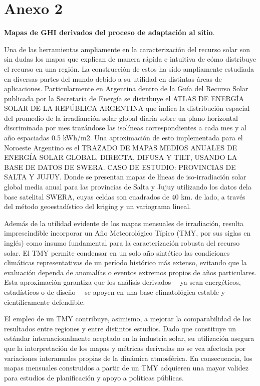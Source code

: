 \rhead{\newtitle}
\cfoot{\thepage}
\renewcommand{\headrulewidth}{1pt}
\renewcommand{\footrulewidth}{1pt}

\chapter*{Anexo 2}


\noindent \textbf{Mapas de GHI derivados del proceso de adaptación al sitio}.

Una de las herramientas ampliamente en la caracterización del recurso solar son sin dudas los mapas que explican de manera rápida e intuitiva de cómo distribuye el recurso en una región. La construcción de estos ha sido ampliamente estudiada en diversas partes del mundo debido a su utilidad en distintas áreas de aplicaciones. Particularmente en Argentina dentro de la Guía del Recurso Solar publicada por la Secretaría de Energía se distribuye el ATLAS DE ENERGÍA SOLAR DE LA REPÚBLICA ARGENTINA que indica la distribución espacial del promedio de la irradianción solar global diaria sobre un plano horizontal discriminada por mes trazándose las isolíneas correspondientes a cada mes y al año
espaciadas 0.5 kWh/m2. Una aproximación de esto implementada para el Noroeste Argentino es el TRAZADO DE MAPAS MEDIOS ANUALES DE ENERGÍA SOLAR GLOBAL, DIRECTA, DIFUSA Y TILT, USANDO LA BASE DE DATOS DE SWERA. CASO DE ESTUDIO: PROVINCIAS DE SALTA Y JUJUY. Donde se presentan mapas de líneas de iso-irradiación solar global media anual para las provincias de Salta y Jujuy utilizando los datos dela base satelital SWERA, cuyas celdas son cuadrados de 40 km. de lado, a través del método geoestadístico del kriging y un variograma lineal. 


Además de la utilidad evidente de los mapas mensuales de irradiación, resulta imprescindible incorporar un Año Meteorológico Típico (TMY, por sus siglas en inglés) como insumo fundamental para la caracterización robusta del recurso solar. El TMY permite condensar en un solo año sintético las condiciones climáticas representativas de un período histórico más extenso, evitando que la evaluación dependa de anomalías o eventos extremos propios de años particulares. Esta aproximación garantiza que los análisis derivados —ya sean energéticos, estadísticos o de diseño— se apoyen en una base climatológica estable y científicamente defendible.

El empleo de un TMY contribuye, asimismo, a mejorar la comparabilidad de los resultados entre regiones y entre distintos estudios. Dado que constituye un estándar internacionalmente aceptado en la industria solar, su utilización asegura que la interpretación de los mapas y métricas derivadas no se vea afectada por variaciones interanuales propias de la dinámica atmosférica. En consecuencia, los mapas mensuales construidos a partir de un TMY adquieren una mayor validez para estudios de planificación y apoyo a políticas públicas.


